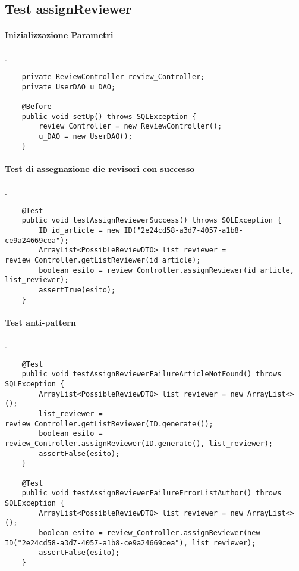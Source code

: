 \subsection{Test assignReviewer}
\paragraph{Inizializzazione Parametri}
.
\begin{lstlisting}
    private ReviewController review_Controller;
    private UserDAO u_DAO;

    @Before
    public void setUp() throws SQLException {
        review_Controller = new ReviewController();
        u_DAO = new UserDAO();
    }
\end{lstlisting}
\paragraph{Test di assegnazione die revisori con successo}
.
\begin{lstlisting}
    @Test
    public void testAssignReviewerSuccess() throws SQLException {
        ID id_article = new ID("2e24cd58-a3d7-4057-a1b8-ce9a24669cea");
        ArrayList<PossibleReviewDTO> list_reviewer = review_Controller.getListReviewer(id_article);
        boolean esito = review_Controller.assignReviewer(id_article, list_reviewer);
        assertTrue(esito);
    }
\end{lstlisting}
\paragraph{Test anti-pattern}
.
\begin{lstlisting}
    @Test
    public void testAssignReviewerFailureArticleNotFound() throws SQLException {
        ArrayList<PossibleReviewDTO> list_reviewer = new ArrayList<>();
        list_reviewer = review_Controller.getListReviewer(ID.generate());
        boolean esito = review_Controller.assignReviewer(ID.generate(), list_reviewer);
        assertFalse(esito);
    }

    @Test
    public void testAssignReviewerFailureErrorListAuthor() throws SQLException {
        ArrayList<PossibleReviewDTO> list_reviewer = new ArrayList<>();
        boolean esito = review_Controller.assignReviewer(new ID("2e24cd58-a3d7-4057-a1b8-ce9a24669cea"), list_reviewer);
        assertFalse(esito);
    }
\end{lstlisting}
